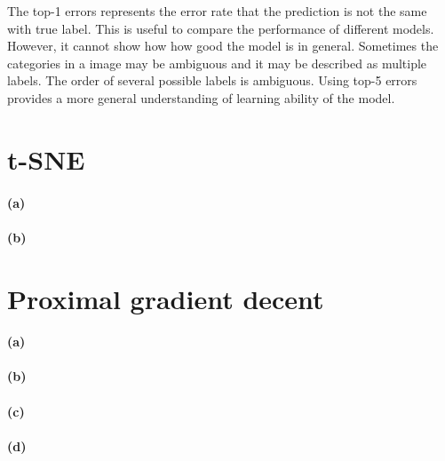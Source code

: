 \documentclass{article}
\begin{document}
The top-1 errors represents the error rate that the prediction is not the same with true label. This is useful to compare the performance of different models. However, it cannot show how how good the model is in general.
Sometimes the categories in a image may be ambiguous and it may be described as multiple labels. The order of several possible labels is ambiguous.
Using top-5 errors provides a more general understanding of learning ability of the model. 

\section{t-SNE}
\paragraph{(a)}

\paragraph{(b)}


\section{Proximal gradient decent}

\paragraph{(a)}
\paragraph{(b)}
\paragraph{(c)}
\paragraph{(d)}
\end{document}
